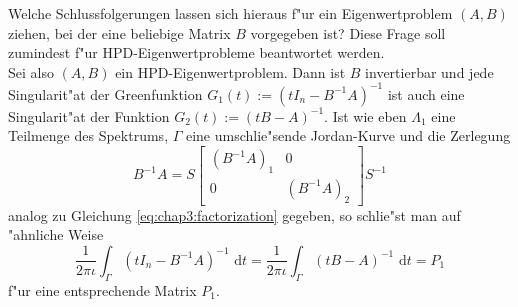 Welche Schlussfolgerungen lassen sich hieraus f"ur ein Eigenwertproblem $(A,B)$ ziehen, bei der eine beliebige Matrix $B$ vorgegeben ist? Diese Frage soll zumindest f"ur HPD-Eigenwertprobleme beantwortet werden.\\

Sei also $(A,B)$ ein HPD-Eigenwertproblem. Dann ist $B$ invertierbar und jede Singularit"at der Greenfunktion $G_1(t) := (t I_n - B^{-1}A)^{-1}$
ist auch eine Singularit"at der Funktion $G_2(t):=(t B - A)^{-1}$. Ist wie eben $\Lambda_1$ eine Teilmenge des Spektrums, $\Gamma$ eine umschlie"sende Jordan-Kurve und die Zerlegung
\[
B^{-1}A = S\begin{bmatrix} (B^{-1} A)_1 & 0 \\ 0 & (B^{-1} A)_2 \end{bmatrix} S^{-1}
\]
analog zu Gleichung \ref{eq:chap3:factorization} gegeben, so schlie"st man auf "ahnliche Weise
\[
\frac{1}{2\pi\iota}\int_\Gamma (t I_n - B^{-1}A)^{-1} \text{ d}t =
\frac{1}{2\pi\iota}\int_\Gamma (t B - A)^{-1} \text{ d}t
= P_1
\]
f"ur eine entsprechende Matrix $P_1$.




